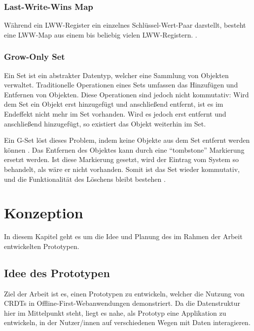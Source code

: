 \documentclass[a4paper, 12pt]{scrreprt}
\begin{document}
\subsection{Last-Write-Wins Map}
\label{sec:lwwMap}
\sloppypar
Während ein \ac{LWW-Register} ein einzelnes Schlüssel-Wert-Paar darstellt, besteht eine LWW-Map aus einem bis beliebig vielen LWW-Registern. \autocite[43]{PhdthesisLwwMap}.


\subsection{Grow-Only Set}
\label{sec:g-set}
Ein Set ist ein abstrakter Datentyp, welcher eine Sammlung von Objekten verwaltet. Traditionelle Operationen eines Sets umfassen das Hinzufügen und Entfernen von Objekten. Diese Operationen sind jedoch nicht kommutativ: Wird dem Set ein Objekt erst hinzugefügt und anschließend entfernt, ist es im Endeffekt nicht mehr im Set vorhanden. Wird es jedoch erst entfernt und anschließend hinzugefügt, so existiert das Objekt weiterhin im Set.

Ein \ac{G-Set} löst dieses Problem, indem keine Objekte aus dem Set entfernt werden können  \autocite[S.17]{ArticlePureOP}. Das Entfernen des Objektes kann durch eine \enquote{tombstone} Markierung ersetzt werden. Ist diese Markierung gesetzt, wird der Eintrag vom System so behandelt, als wäre er nicht vorhanden. Somit ist das Set wieder kommutativ, und die Funktionalität des Löschens bleibt bestehen \autocite[S.7]{InproceedingsTombstone}.


\chapter{Konzeption}
In diesem Kapitel geht es um die Idee und Planung des im Rahmen der Arbeit entwickelten Prototypen. 

\section{Idee des Prototypen}
Ziel der Arbeit ist es, einen Prototypen zu entwickeln, welcher die Nutzung von \acp{CRDT} in Offline-First-Webanwendungen demonstriert. Da die Datenstruktur hier im Mittelpunkt steht, liegt es nahe, als Prototyp eine Applikation zu entwickeln, in der Nutzer/innen auf verschiedenen Wegen mit Daten interagieren.
\end{document}
